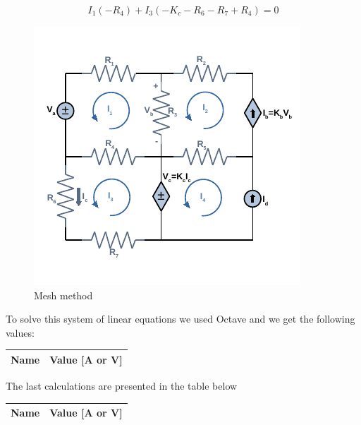 \begin{center}
    \begin{equation}
        I_1(-R_4)+I_3(-K_c-R_6-R_7+R_4)=0 
    \end{equation}
\end{center}


\begin{figure}[h] \centering
\includegraphics[width=0.8\linewidth]{mesh.pdf}
\caption{Mesh method}
\label{fig:forced}
\end{figure}



To solve this system of linear equations we used Octave and we get the following values:

\begin{table}
  \centering
  \begin{tabular}{|l|r|}
    \hline    
    {\bf Name} & {\bf Value [A or V]} \\ \hline
    
  \end{tabular}
  \label{tab:op}
\end{table}

The last calculations are presented in the table below 

\begin{table}[h]
  \centering
  \begin{tabular}{|l|r|}
    \hline    
    {\bf Name} & {\bf Value [A or V]} \\ \hline
    
  \end{tabular}
  \label{tab:op}
\end{table}


